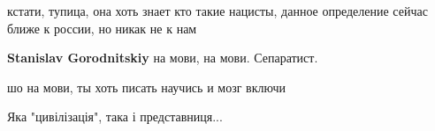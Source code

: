 \begin{itemize}
кстати, тупица, она хоть знает кто такие нацисты, данное определение сейчас
ближе к россии, но никак не к нам

\begin{itemize}
 
\textbf{Stanislav Gorodnitskiy} на мови, на мови. Сепаратист.

 
шо на мови, ты хоть писать научись и мозг включи
\end{itemize}

 
Яка "цивілізація", така і представниця...



\end{itemize}
